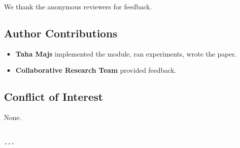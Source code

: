 We thank the anonymous reviewers for feedback.

\subsection{Author Contributions}

\begin{itemize}
\item \textbf{Taha Majs} implemented the module, ran experiments, wrote the paper.
\item \textbf{Collaborative Research Team} provided feedback.

\end{itemize}
\subsection{Conflict of Interest}

None.
\begin{lstlisting}

---
\end{lstlisting}